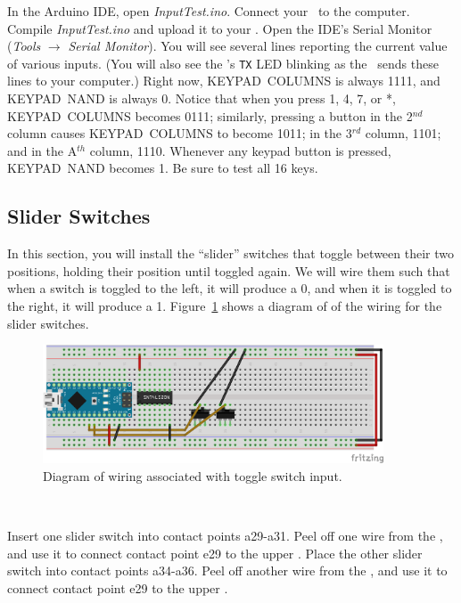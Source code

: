 
In the Arduino IDE, open \textit{InputTest.ino}. Connect your \nano\ to the
computer. Compile \textit{InputTest.ino} and upload it to your \nano. Open the
IDE's Serial Monitor (\textit{Tools} $\rightarrow$ \textit{Serial Monitor}).
You will see several lines reporting the current value of various inputs. (You
will also see the \nano's \texttt{TX} LED blinking as the \nano\ sends these
lines to your computer.) Right now, KEYPAD~COLUMNS is always 1111, and
KEYPAD~NAND is always 0. Notice that when you press 1, 4, 7, or *,
KEYPAD~COLUMNS becomes 0111; similarly, pressing a button in the 2$^{nd}$
column causes KEYPAD~COLUMNS to become 1011; in the 3$^{rd}$ column, 1101; and
in the A$^{th}$ column, 1110. Whenever any keypad button is pressed,
KEYPAD~NAND becomes 1. Be sure to test all 16 keys.

\subsection{Slider Switches}

In this section, you will install the ``slider'' switches that toggle between
their two positions, holding their position until toggled again. We will wire
them such that when a switch is toggled to the left, it will produce a 0, and
when it is toggled to the right, it will produce a 1.
Figure~\ref{fig:switch-diagram} shows a diagram of of the wiring for the
slider switches.

\begin{figure}[p]
    \centering
    \includegraphics[width=0.9\textwidth]{fritzing_images/switch}
    \caption{Diagram of wiring associated with toggle switch input.
        \label{fig:switch-diagram}}
\end{figure}

\disconnect\

Insert one slider switch into contact points a29-a31. Peel off one wire from
the \rainbow, and use it to connect contact point e29 to the upper \ground.
Place the other slider switch into contact points a34-a36. Peel off another
wire from the \rainbow, and use it to connect contact point e29 to the upper
\ground. %

